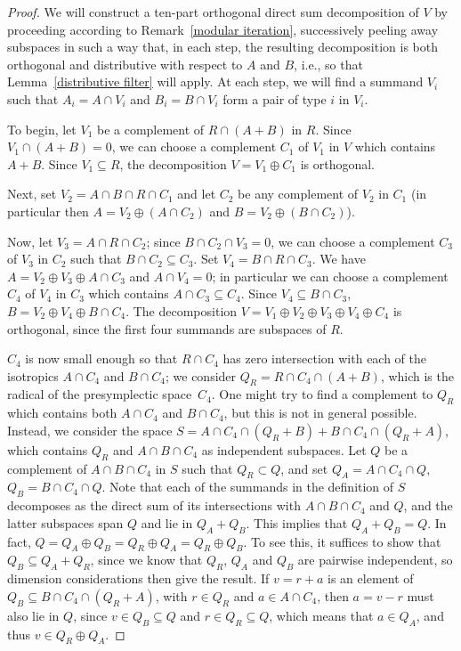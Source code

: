\documentclass[pdftex]{sigma}
\numberwithin{equation}{section}
\begin{document}
\begin{proof}
We will construct a ten-part orthogonal direct sum decomposition of $V$ by proceeding according to Remark~\ref{modular iteration}, successively peeling away subspaces in such a way that, in each step, the resulting decomposition is both orthogonal and distributive with respect to $A$ and $B$,  i.e., so that Lemma~\ref{distributive filter} will apply. At each step, we will f\/ind a summand $V_i$ such that $A_i = A \cap V_i$ and $B_i=B \cap V_i$ form a pair of type $i$ in $V_i$.

To begin, let $V_1$ be a complement of $R \cap (A + B)$ in $R$. Since $V_1 \cap (A + B) = 0$, we can choose a complement $C_1$ of $V_1$ in $V$ which contains $A + B$.   Since $V_1\subseteq R$, the decomposition $V=V_1 \oplus C_1$ is orthogonal.

Next, set $V_2 = A \cap B \cap R \cap C_1$ and let $C_2$ be any complement of $V_2$ in $C_1$ (in particular then $A = V_2 \oplus (A \cap C_2)$ and $B = V_2 \oplus (B \cap C_2)$).

Now, let $V_3 = A \cap R \cap C_2$; since $B \cap C_2 \cap V_3 = 0$, we can choose a complement $C_3$ of $V_3$ in $C_2$ such that $B \cap C_2 \subseteq C_3$. Set $V_4 = B \cap R \cap C_3$. We have $A = V_2 \oplus V_3 \oplus A \cap C_3$ and $A \cap V_4 = 0$; in particular we can choose a complement $C_4$ of $V_4$ in $C_3$ which contains $A \cap C_3 \subseteq C_4$.   Since $V_4 \subseteq B \cap C_3$, $B = V_2 \oplus V_4 \oplus B \cap C_4$. The decomposition $V = V_1 \oplus V_2 \oplus V_3 \oplus V_4 \oplus C_4$ is orthogonal, since the f\/irst four summands are subspaces of $R$.

$C_4$ is now small enough so that $R \cap C_4$ has zero intersection with each of the isotropics $A \cap C_4$ and $B \cap C_4$; we consider $Q_R = R \cap C_4 \cap (A + B)$, which is the radical of the presymplectic space~$C_4$. One might try to f\/ind a complement to $Q_R$ which contains both $A \cap C_4$ and $B \cap C_4$, but this is not in general possible. Instead, we consider the space $S = A \cap C_4 \cap (Q_R + B) + B \cap C_4 \cap (Q_R + A)$, which contains $Q_R$ and $A \cap B \cap C_4$ as independent subspaces. Let $Q$ be a complement of $A \cap B \cap C_4$ in $S$ such that $Q_R \subset Q$, and set $Q_A = A \cap C_4 \cap Q$, $Q_B = B \cap C_4 \cap Q$. Note that each of the summands in the def\/inition of $S$ decomposes as the direct sum of its intersections with $A \cap B \cap C_4$ and $Q$, and the latter subspaces span $Q$ and lie in $Q_A +Q_B$. This implies that $Q_A + Q_B = Q$. In fact, $Q = Q_A \oplus Q_B = Q_R \oplus Q_A  = Q_R \oplus Q_B$. To see this, it suf\/f\/ices to show that $Q_B \subseteq Q_A + Q_R$, since we know that $Q_R$, $Q_A$ and $Q_B$ are pairwise independent, so dimension considerations then give the result. If $v = r + a$ is an element of $Q_B \subseteq B \cap C_4 \cap (Q_R + A)$, with $r \in Q_R$ and $a \in A \cap C_4$, then $a = v - r$ must also lie in $Q$, since $v \in Q_B \subseteq Q$ and $r \in Q_R \subseteq Q$, which means that $a \in Q_A$, and thus $v \in Q_R \oplus Q_A$.


\end{proof}
\end{document}

